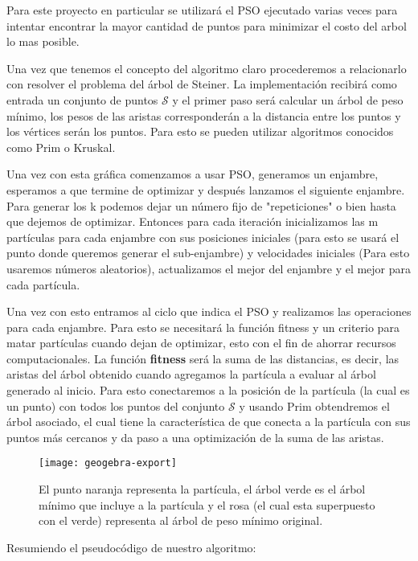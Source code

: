 \documentclass[11pt,letterpaper]{article}
\begin{document}
Para este proyecto en particular se utilizará el PSO ejecutado varias veces para intentar encontrar la mayor cantidad de puntos para minimizar el costo del arbol lo mas posible.

Una vez que tenemos el concepto del algoritmo claro procederemos a relacionarlo con resolver el problema del árbol de Steiner. La implementación recibirá como entrada un conjunto de puntos $\mathcal{S}$ y el primer paso será calcular un árbol de peso mínimo, los pesos de las aristas corresponderán a la distancia entre los puntos y los vértices serán los puntos. Para esto se pueden utilizar algoritmos conocidos como Prim o Kruskal.

Una vez con esta gráfica comenzamos a usar PSO, generamos un enjambre, esperamos a que termine de optimizar y después lanzamos el siguiente enjambre. Para generar los k podemos dejar un número fijo de "repeticiones" o bien hasta que dejemos de optimizar. Entonces para cada iteración inicializamos las m partículas para cada enjambre con sus posiciones iniciales (para esto se usará el punto donde queremos generar el sub-enjambre) y velocidades iniciales (Para esto usaremos números aleatorios), actualizamos el mejor del enjambre y el mejor para cada partícula.

Una vez con esto entramos al ciclo que indica el PSO y realizamos las operaciones para cada enjambre. Para esto se necesitará la función fitness y un criterio para matar partículas cuando dejan de optimizar, esto con el fin de ahorrar recursos computacionales. La función \textbf{fitness} será la suma de las distancias, es decir, las aristas del árbol obtenido cuando agregamos la partícula a evaluar al árbol generado al inicio. %
Para esto conectaremos a la posición de la partícula (la cual es un punto) con todos los puntos del conjunto $\mathcal{S}$ y usando Prim obtendremos el árbol asociado, el cual tiene la característica de que conecta a la partícula con sus puntos más cercanos y da paso a una optimización de la suma de las aristas.

\begin{figure}
	\centering
	\texttt{[image: geogebra-export]}
	\caption{\small El punto naranja representa la partícula, el árbol verde es el árbol mínimo que incluye a la partícula y el rosa (el cual esta superpuesto con el verde) representa al árbol de peso mínimo original.}
	\label{fig:geogebra-export}
\end{figure}

Resumiendo el pseudocódigo de nuestro algoritmo:
\end{document}
